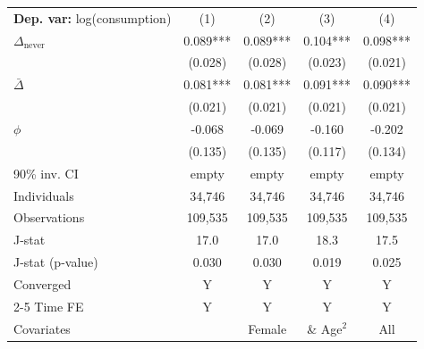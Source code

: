 \begin{tabular}{l cccc} \toprule  \textbf{Dep. var:}  log(consumption) 
                    &\multicolumn{1}{c}{(1)}   &\multicolumn{1}{c}{(2)}   &\multicolumn{1}{c}{(3)}   &\multicolumn{1}{c}{(4)}   \\

\addlinespace
$\Delta_{\text{never}}$&       0.089***&       0.089***&       0.104***&       0.098***\\
                    &     (0.028)   &     (0.028)   &     (0.023)   &     (0.021)   \\

\addlinespace
$\bar{\Delta}$      &       0.081***&       0.081***&       0.091***&       0.090***\\
                    &     (0.021)   &     (0.021)   &     (0.021)   &     (0.021)   \\

\addlinespace
$\phi$              &      -0.068   &      -0.069   &      -0.160   &      -0.202   \\
                    &     (0.135)   &     (0.135)   &     (0.117)   &     (0.134)   \\
90\% inv. CI        &       empty   &       empty   &       empty   &       empty   \\
Individuals         &      34,746   &      34,746   &      34,746   &      34,746   \\
Observations        &     109,535   &     109,535   &     109,535   &     109,535   \\
J-stat              &        17.0   &        17.0   &        18.3   &        17.5   \\
J-stat (p-value)    &       0.030   &       0.030   &       0.019   &       0.025   \\
Converged           &           Y   &           Y   &           Y   &           Y   \\
\cmidrule{2-5} Time FE & Y & Y & Y & Y \\ Covariates & & Female & \& Age$^2$ & All \\ \bottomrule \end{tabular}

